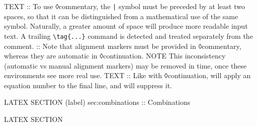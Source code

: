 \begin{lbt}
    TEXT
    :: To use ◊commentary, the \Verb+|+ symbol must be preceded by at least two spaces, so that it can be distinguished from a mathematical use of the same symbol. Naturally, a greater amount of space will produce more readable input text. A trailing \Verb|\tag{...}| command is detected and treated separately from the comment.
    :: Note that alignment markers must be provided in ◊commentary, whereas they are automatic in ◊continuation.
    NOTE This inconsistency (automatic vs manual alignment markers) may be removed in time, once these environments see more real use.
    TEXT
    :: Like with ◊continuation,  will apply an equation number to the final line, and  will suppress it.

    LATEX \FloatBarrier
    SECTION (label) sec:combinations :: Combinations



    LATEX \FloatBarrier
    SECTION 





\end{lbt}
